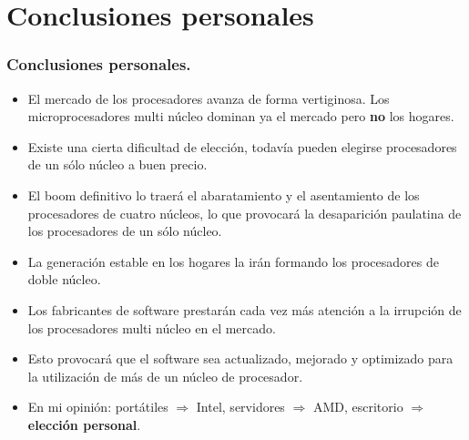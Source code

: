 \section{Conclusiones personales}
\frame
{
\frametitle{Conclusiones personales.}
\begin{itemize}
 \item El mercado de los procesadores avanza de forma vertiginosa. Los microprocesadores multi núcleo dominan ya el mercado pero \textbf{no} los hogares.
 \item Existe una cierta dificultad de elección, todavía pueden elegirse procesadores de un sólo núcleo a buen precio.
 \item El boom definitivo lo traerá el abaratamiento y el asentamiento de los procesadores de cuatro núcleos, lo que provocará la desaparición paulatina de los procesadores de un sólo núcleo.
 \item La generación estable en los hogares la irán formando los procesadores de doble núcleo.
 \item Los fabricantes de software prestarán cada vez más atención a la irrupción de los procesadores multi núcleo en el mercado.
 \item Esto provocará que el software sea actualizado, mejorado y optimizado para la utilización de más de un núcleo de procesador.
 \item En mi opinión: portátiles $\Rightarrow$ Intel, servidores $\Rightarrow$ AMD, escritorio $\Rightarrow$ \textbf{elección personal}.
\end{itemize}
}
